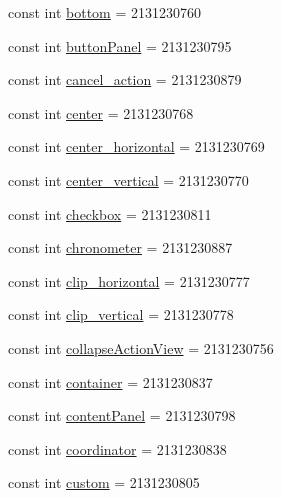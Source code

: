 \begin{CompactItemize}
\item 
const int \hyperlink{class__2doo_1_1_droid_1_1_resource_1_1_id_287c1ef7c6a675f21daa432c42057faf}{bottom} = 2131230760
\item 
const int \hyperlink{class__2doo_1_1_droid_1_1_resource_1_1_id_5fd50c453c6ec2189b281dbf934485a3}{buttonPanel} = 2131230795
\item 
const int \hyperlink{class__2doo_1_1_droid_1_1_resource_1_1_id_1f1f6edaf5b1c636e82347fcebde017d}{cancel\_\-action} = 2131230879
\item 
const int \hyperlink{class__2doo_1_1_droid_1_1_resource_1_1_id_008355d44756b4d3abfbb912ce27a5c0}{center} = 2131230768
\item 
const int \hyperlink{class__2doo_1_1_droid_1_1_resource_1_1_id_f15fb9b19068a3d454d9c8f7e5331896}{center\_\-horizontal} = 2131230769
\item 
const int \hyperlink{class__2doo_1_1_droid_1_1_resource_1_1_id_6a8b2b4ee5307e73f368876bc26d2ba2}{center\_\-vertical} = 2131230770
\item 
const int \hyperlink{class__2doo_1_1_droid_1_1_resource_1_1_id_5621ef605c0ca1450cc1642b3637d49d}{checkbox} = 2131230811
\item 
const int \hyperlink{class__2doo_1_1_droid_1_1_resource_1_1_id_597f2c11928decbff8133b549d73bac4}{chronometer} = 2131230887
\item 
const int \hyperlink{class__2doo_1_1_droid_1_1_resource_1_1_id_2a879e1f8fe59fcec5331e09238964cd}{clip\_\-horizontal} = 2131230777
\item 
const int \hyperlink{class__2doo_1_1_droid_1_1_resource_1_1_id_4d5b3f73085d38eeb1092d754ecd1e50}{clip\_\-vertical} = 2131230778
\item 
const int \hyperlink{class__2doo_1_1_droid_1_1_resource_1_1_id_4382174a9d778ab31a2ac24159fa97ec}{collapseActionView} = 2131230756
\item 
const int \hyperlink{class__2doo_1_1_droid_1_1_resource_1_1_id_eefbfbb670927c41deca4965461549da}{container} = 2131230837
\item 
const int \hyperlink{class__2doo_1_1_droid_1_1_resource_1_1_id_8f013f2546edf234cfedf3c5884113dc}{contentPanel} = 2131230798
\item 
const int \hyperlink{class__2doo_1_1_droid_1_1_resource_1_1_id_2d771d4e34ea096877390b631ed6d513}{coordinator} = 2131230838
\item 
const int \hyperlink{class__2doo_1_1_droid_1_1_resource_1_1_id_45495df5ff23d67f0e378c3d1dc310cd}{custom} = 2131230805
\item 

\end{CompactItemize}
